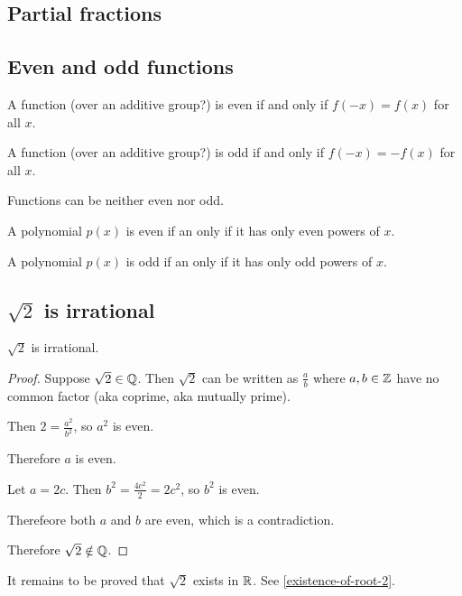 \subsection{Partial fractions}


\subsection{Even and odd functions}

\begin{definition*}
  A function (over an additive group?) is even if and only if $f(-x) = f(x)$ for all $x$.

  A function (over an additive group?) is odd if and only if $f(-x) = -f(x)$ for all $x$.
\end{definition*}

Functions can be neither even nor odd.

\begin{claim*}
  A polynomial $p(x)$ is even if an only if it has only even powers of $x$.

  A polynomial $p(x)$ is odd if an only if it has only odd powers of $x$.
\end{claim*}

\subsection{$\sqrt{2}$ is irrational}
\begin{claim*}
  $\sqrt{2}$ is irrational.
\end{claim*}

\begin{proof}
  Suppose $\sqrt{2} \in \mathbb{Q}$. Then $\sqrt{2}$ can be written as $\frac{a}{b}$ where $a, b \in \mathbb{Z}$
  have no common factor (aka coprime, aka mutually prime).

  Then $2 = \frac{a^2}{b^2}$, so $a^2$ is even.

  Therefore $a$ is even.

  Let $a = 2c$. Then $b^2 = \frac{4c^2}{2} = 2c^2$, so $b^2$ is even.

  Therefeore both $a$ and $b$ are even, which is a contradiction.

  Therefore $\sqrt{2} \notin \mathbb{Q}$.
\end{proof}

\begin{remark*}
  It remains to be proved that $\sqrt{2}$ exists in $\mathbb{R}$. See \ref{existence-of-root-2}.
\end{remark*}

